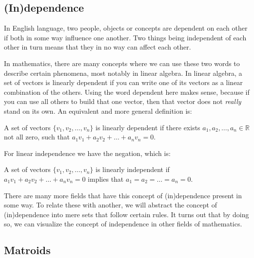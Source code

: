 \subsection{(In)dependence}

In English language, two people, objects or concepts are dependent on each other if both in some way influence one another. Two things being independent of each other in turn means that they in no way can affect each other. 

    In mathematics, there are many concepts where we can use these two words to describe certain phenomena, most notably in linear algebra. In linear algebra, a set of vectors is linearly dependent if you can write one of its vectors as a linear combination of the others. Using the word dependent here makes sense, because if you can use all others to build that one vector, then that vector does not \textit{really} stand on its own. An equivalent and more general definition is:


    \begin{defn}

    A set of vectors $\{v_1,v_2,\dots,v_n\}$ is linearly dependent if there exists $a_1,a_2,\dots,a_n \in \mathbb{R} $ not all zero, such that $a_1v_1+a_2v_2+\dots +a_nv_n = 0.$
    
    \end{defn}




For linear independence we have the negation, which is:
\begin{defn}
    A set of vectors $ \{v_1,v_2,\dots,v_n\}$ is linearly independent if $a_1v_1+a_2v_2+\dots+a_nv_n=0$ implies that $a_1=a_2=\dots=a_n=0.$

\end{defn}
There are many more fields that have this concept of (in)dependence present in some way. To relate these with another, we will abstract the concept of (in)dependence into mere sets that follow certain rules. It turns out that by doing so, we can visualize the concept of independence in other fields of mathematics.





\subsection{Matroids}

